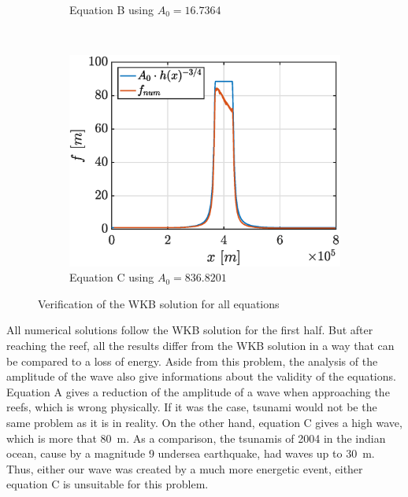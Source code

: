 \documentclass[a4paper,12pt,twoside]{article}
\begin{document}
\begin{figure}[h]
\begin{subfigure}{0.45\textwidth}
          \caption{Equation B using $A_0 = \num{16.7364}$}
          \label{fig:tsunami-amp-B}
        \end{subfigure}\\
        \centering
        \begin{subfigure}{0.45\textwidth}
          \centering
          \includegraphics[width=\textwidth]{graphs/tsunami_amp_C.eps}
          \caption{Equation C using $A_0 = \num{836.8201}$}
          \label{fig:tsunami-amp-C}
        \end{subfigure}
        \caption{Verification of the WKB solution for all equations} %
        \label{fig:tsunami-amp}
      \end{figure}

      All numerical solutions follow the WKB solution for the first half.
      But after reaching the reef, all the results differ from the WKB solution in a way that can be compared to a loss of energy.
      Aside from this problem, the analysis of the amplitude of the wave also give informations about the validity of the equations.
      Equation A gives a reduction of the amplitude of a wave when approaching the reefs, which is wrong physically.
      If it was the case, tsunami would not be the same problem as it is in reality.
      On the other hand, equation C gives a high wave, which is more that \SI{80}{\meter}.
      As a comparison, the tsunamis of 2004 in the indian ocean, cause by a magnitude 9 undersea earthquake, had waves up to \SI{30}{\meter}. \cite{wiki:tsunami-2004}
      Thus, either our wave was created by a much more energetic event, either equation C is unsuitable for this problem.\\
\end{document}
